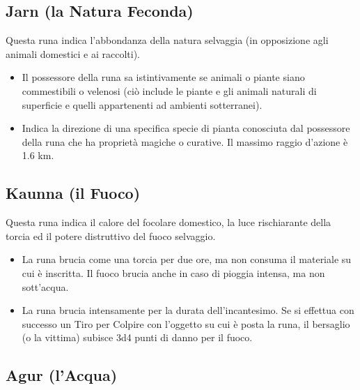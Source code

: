 \documentclass[10pt,a4paper]{article}
\begin{document}
 
\subsection*{Jarn (la Natura Feconda)}
 
Questa runa indica l'abbondanza della natura selvaggia (in opposizione agli animali domestici e ai raccolti).
  \begin{itemize}
\item       Il possessore della runa sa istintivamente se animali o piante siano commestibili o velenosi (ci\`{o} include le piante e gli animali naturali di superficie e quelli appartenenti ad ambienti sotterranei).
 
\item       Indica la direzione di una specifica specie di pianta conosciuta dal possessore della runa che ha propriet\`{a} magiche o curative. Il massimo raggio d'azione \`{e} 1.6 km.
 \end{itemize}
 
 
\subsection*{Kaunna (il Fuoco)}
 
Questa runa indica il calore del focolare domestico, la luce rischiarante della torcia ed il potere distruttivo del fuoco selvaggio.
  \begin{itemize}
\item       La runa brucia come una torcia per due ore, ma non consuma il materiale su cui \`{e} inscritta. Il fuoco brucia anche in caso di pioggia intensa, ma non sott'acqua.
 
\item       La runa brucia intensamente per la durata dell'incantesimo. Se si effettua con successo un Tiro per Colpire con l'oggetto su cui \`{e} posta la runa, il bersaglio (o la vittima) subisce 3d4 punti di danno per il fuoco.
 \end{itemize}
 
 
\subsection*{Agur (l'Acqua)}
 
\end{document}
